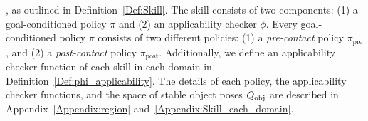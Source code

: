 



\iffalse
, as outlined in Definition~\ref{Def:Skill}. The skill consists of two components: (1) a goal-conditioned policy \( \pi \) and (2) an applicability checker \( \phi \). Every goal-conditioned policy \( \pi \) consists of two different policies: (1) a \textit{pre-contact} policy \( \pi_\text{pre} \), and (2) a \textit{post-contact} policy \( \pi_\text{post} \). Additionally, we define an applicability checker function of each skill in each domain in Definition~\ref{Def:phi_applicability}. The details of each policy, the applicability checker functions, and the space of stable object poses $Q_\text{obj}$ are described in Appendix~\ref{Appendix:region} and~\ref{Appendix:Skill_each_domain}.






